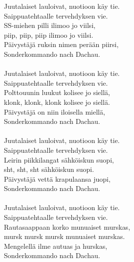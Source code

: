 
            Juutalaiset lauloivat, nuotioon käy tie. \\
            Saippuatehtaalle tervehdyksen vie. \\
            SS-miehen pilli ilimoo jo viilsi, \\
            piip, piip, piip ilimoo jo viilsi. \\
            Päivystäjä ruksin nimen perään piirsi, \\
            Sonderkommando nach Dachau. \\
\hspace{10mm} \\
            Juutalaiset lauloivat, nuotioon käy tie. \\
            Saippuatehtaalle tervehdyksen vie. \\
            Polttouunin luukut kolisee jo siellä, \\
            klonk, klonk, klonk kolisee jo siellä. \\
            Päivystäjä on niin iloisella miellä, \\
            Sonderkommando nach Dachau. \\
\hspace{10mm} \\
            Juutalaiset lauloivat, nuotioon käy tie. \\
            Saippuatehtaalle tervehdyksen vie. \\
            Leirin piikkilangat sähköiskun suopi, \\
            sht, sht, sht sähköiskun suopi. \\
            Päivystäjä vettä krapulaansa juopi, \\
            Sonderkommando nach Dachau. \\
\hspace{10mm} \\
            Juutalaiset lauloivat, nuotioon käy tie. \\
            Saippuatehtaalle tervehdyksen vie. \\
            Rautasaappaan korko munuaiset murskas, \\
            mursk mursk mursk munuaiset murskas. \\
            Mengelellä ilme autuas ja hurskas, \\
            Sonderkommando nach Dachau. \\
\hspace{10mm} \\
